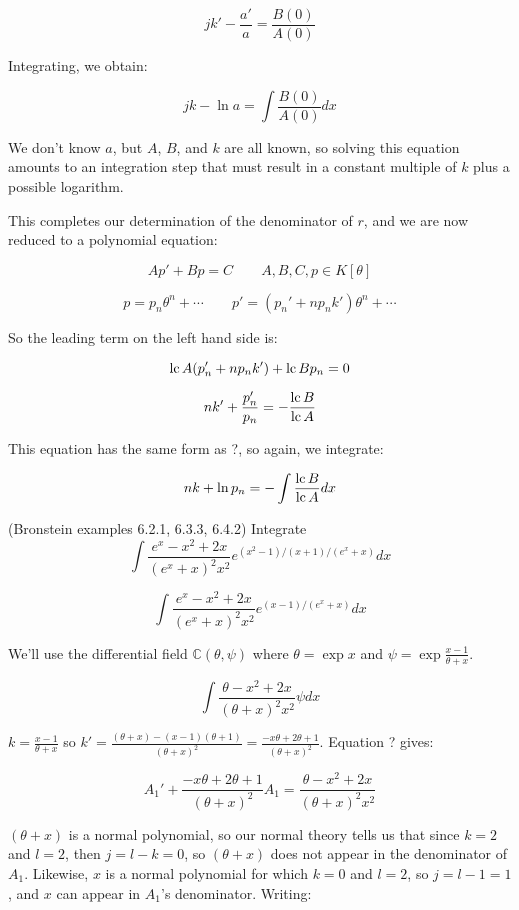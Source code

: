 
$$ jk' - \frac{a'}{a }  = \frac{B(0)}{A(0)}$$

Integrating, we obtain:

$$ jk - \ln a = \int \frac{B(0)}{A(0)} dx$$

We don't know $a$, but $A$, $B$, and $k$ are all known, so solving
this equation amounts to an integration step that must result in a
constant multiple of $k$ plus a possible logarithm.

This completes our determination of the denominator of $r$, and we
are now reduced to a polynomial equation:

$$A p' + B p = C \qquad A,B,C,p \in K[\theta]$$

$$p = p_n \theta^n + \cdots \qquad p' = (p_n' + n p_n k') \theta^n + \cdots$$

So the leading term on the left hand side is:

$${\rm lc\,} A (p_n' + n p_n k') + {\rm lc\,} B p_n = 0$$

$$n k' + \frac{p_n'}{p_n} = - \frac{{\rm lc\,} B}{{\rm lc\,} A}$$

This equation has the same form as ?, so again, we integrate:

$$n k + \ln p_n = - \int \frac{{\rm lc\,} B}{{\rm lc\,} A} dx$$

\vfill\eject

\example (Bronstein examples 6.2.1, 6.3.3, 6.4.2) Integrate
$$\int \frac{e^x - x^2 + 2x}{(e^x + x)^2 x^2}e^{(x^2-1)/(x+1)/(e^x+x)} dx$$

$$\int \frac{e^x - x^2 + 2x}{(e^x + x)^2 x^2}e^{(x-1)/(e^x+x)} dx$$

We'll use the differential field ${\mathbb C}(\theta, \psi)$ where
$\theta = \exp x$ and $\psi = \exp \frac{x-1}{\theta+x}$.

$$\int \frac{\theta - x^2 + 2x}{(\theta + x)^2 x^2} \psi dx$$

$k = \frac{x-1}{\theta+x}$ so
$k' = \frac{(\theta+x) - (x-1)(\theta+1)}{(\theta+x)^2} = \frac{-x\theta + 2 \theta +1}{(\theta+x)^2}$.
Equation ? gives:

$$A_1' + \frac{-x\theta + 2 \theta +1}{(\theta+x)^2} A_1 = \frac{\theta - x^2 + 2x}{(\theta + x)^2 x^2}$$

$(\theta+x)$ is a normal polynomial, so our normal theory tells us that
since $k=2$ and $l=2$, then $j=l-k=0$, so $(\theta+x)$ does not appear
in the denominator of $A_1$.  Likewise, $x$ is a normal polynomial
for which $k=0$ and $l=2$, so $j=l-1 = 1$, and $x$ can appear in
$A_1$'s denominator.  Writing:


